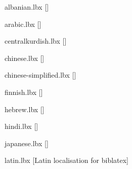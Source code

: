 
\begin{filecontents*}{albanian.lbx}
    [\abx@lbxid]
\end{filecontents*}

\begin{filecontents*}{arabic.lbx}
    [\abx@lbxid]
\end{filecontents*}

\begin{filecontents*}{centralkurdish.lbx}
    [\abx@lbxid]
\end{filecontents*}

\begin{filecontents*}{chinese.lbx}
    [\abx@lbxid]
\end{filecontents*}

\begin{filecontents*}{chinese-simplified.lbx}
    [\abx@lbxid]
\end{filecontents*}

\begin{filecontents*}{finnish.lbx}
    [\abx@lbxid]
\end{filecontents*}

\begin{filecontents*}{hebrew.lbx}
    [\abx@lbxid]
\end{filecontents*}

\begin{filecontents*}{hindi.lbx}
    [\abx@lbxid]
\end{filecontents*}

\begin{filecontents*}{japanese.lbx}
    [\abx@lbxid]
\end{filecontents*}

\begin{filecontents*}{latin.lbx}
[\abx@lbxid Latin localisation for biblatex]



\end{filecontents*}

